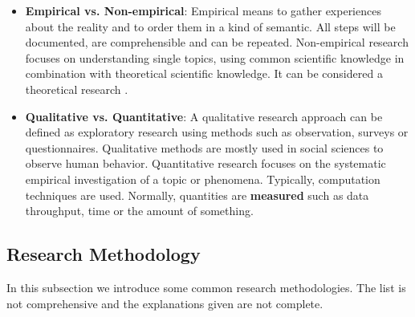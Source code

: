 \documentclass[a4paper]{article}
\begin{document}
\begin{itemize}
\item  \textbf{Empirical vs. Non-empirical}: Empirical means to gather experiences about the reality and to order them in a kind of semantic. All steps will be documented, are comprehensible and can be repeated.
Non-empirical research focuses on understanding single topics, using common scientific knowledge in combination with theoretical scientific knowledge. It can be considered a theoretical research \cite{hans2005methoden}.

\item \textbf{Qualitative vs. Quantitative}: A qualitative research approach can be defined as exploratory research using methods such as observation, surveys or questionnaires. Qualitative methods are mostly used in social sciences to observe human behavior. Quantitative research focuses on the systematic empirical investigation of a topic or phenomena. Typically, computation techniques are used. Normally, quantities are \textbf{measured} such as data throughput, time or the amount of something.

\end{itemize}

\subsection{Research Methodology}

In this subsection we introduce some common research methodologies. The list is not comprehensive and the explanations given are not complete. \\
\end{document}
